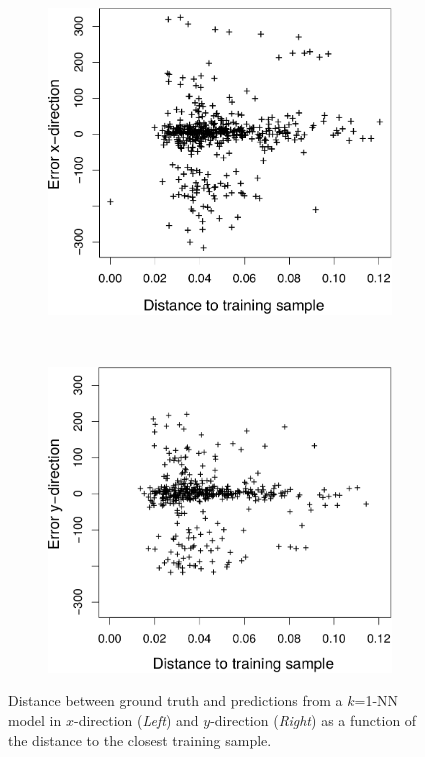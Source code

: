 \documentclass[11pt]{report}
\begin{document}
\begin{figure}[H]
  \centering
  \begin{subfigure}[b]{0.5\textwidth}
  \includegraphics[width=1\textwidth]{dependency_dist_error_x-crop}
  \label{fig:cosinesim}
  \end{subfigure}%
~
  \begin{subfigure}[b]{0.5\textwidth}
  \includegraphics[width=1\textwidth]{dependency_dist_error_y-crop}
  \label{fig:cosinesd}
  \end{subfigure}
  \caption{Distance between ground truth and predictions from a
    $k$=1-NN model in $x$-direction (\emph{Left}) and $y$-direction
    (\emph{Right}) as a function of the distance to the closest
    training sample.}
\label{fig:cor_sim_confi}
\end{figure}
\end{document}
